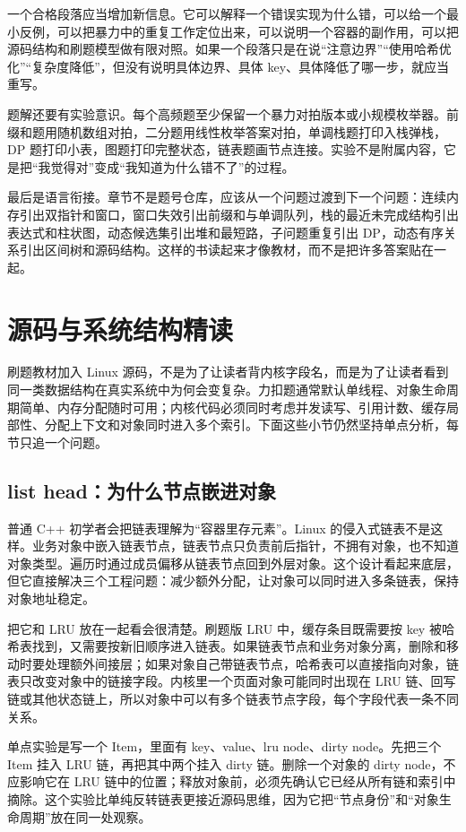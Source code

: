 一个合格段落应当增加新信息。它可以解释一个错误实现为什么错，可以给一个最小反例，可以把暴力中的重复工作定位出来，可以说明一个容器的副作用，可以把源码结构和刷题模型做有限对照。如果一个段落只是在说“注意边界”“使用哈希优化”“复杂度降低”，但没有说明具体边界、具体 key、具体降低了哪一步，就应当重写。

题解还要有实验意识。每个高频题至少保留一个暴力对拍版本或小规模枚举器。前缀和题用随机数组对拍，二分题用线性枚举答案对拍，单调栈题打印入栈弹栈，DP 题打印小表，图题打印完整状态，链表题画节点连接。实验不是附属内容，它是把“我觉得对”变成“我知道为什么错不了”的过程。

最后是语言衔接。章节不是题号仓库，应该从一个问题过渡到下一个问题：连续内存引出双指针和窗口，窗口失效引出前缀和与单调队列，栈的最近未完成结构引出表达式和柱状图，动态候选集引出堆和最短路，子问题重复引出 DP，动态有序关系引出区间树和源码结构。这样的书读起来才像教材，而不是把许多答案贴在一起。

\section{源码与系统结构精读}

刷题教材加入 Linux 源码，不是为了让读者背内核字段名，而是为了让读者看到同一类数据结构在真实系统中为何会变复杂。力扣题通常默认单线程、对象生命周期简单、内存分配随时可用；内核代码必须同时考虑并发读写、引用计数、缓存局部性、分配上下文和对象同时进入多个索引。下面这些小节仍然坚持单点分析，每节只追一个问题。

\subsection{list head：为什么节点嵌进对象}

普通 C++ 初学者会把链表理解为“容器里存元素”。Linux 的侵入式链表不是这样。业务对象中嵌入链表节点，链表节点只负责前后指针，不拥有对象，也不知道对象类型。遍历时通过成员偏移从链表节点回到外层对象。这个设计看起来底层，但它直接解决三个工程问题：减少额外分配，让对象可以同时进入多条链表，保持对象地址稳定。

把它和 LRU 放在一起看会很清楚。刷题版 LRU 中，缓存条目既需要按 key 被哈希表找到，又需要按新旧顺序进入链表。如果链表节点和业务对象分离，删除和移动时要处理额外间接层；如果对象自己带链表节点，哈希表可以直接指向对象，链表只改变对象中的链接字段。内核里一个页面对象可能同时出现在 LRU 链、回写链或其他状态链上，所以对象中可以有多个链表节点字段，每个字段代表一条不同关系。

单点实验是写一个 Item，里面有 key、value、lru node、dirty node。先把三个 Item 挂入 LRU 链，再把其中两个挂入 dirty 链。删除一个对象的 dirty node，不应影响它在 LRU 链中的位置；释放对象前，必须先确认它已经从所有链和索引中摘除。这个实验比单纯反转链表更接近源码思维，因为它把“节点身份”和“对象生命周期”放在同一处观察。

